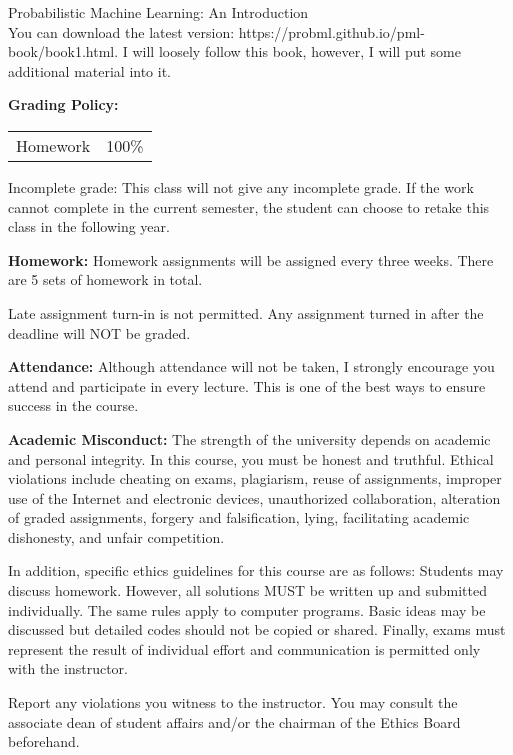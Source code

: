 \documentclass[a4paper,10pt]{article}
\begin{document}
Probabilistic Machine Learning: An Introduction \\
You can download the latest version: https://probml.github.io/pml-book/book1.html. 
 I will loosely follow this book, however, I will put some additional material into it. 


\textbf{Grading Policy:}

\begin{tabular}{lr}
Homework & 100\%\\
\end{tabular}


Incomplete grade: This class will not give any
incomplete grade. If the work cannot complete in the
current semester, the student can choose to retake this
class in the following year.






\textbf{Homework:} Homework assignments will be assigned every three weeks. There are 5 sets of homework in total. 

Late assignment turn-in is not permitted. Any assignment turned in after the deadline will NOT be graded.




\textbf{Attendance:} Although attendance will not be taken, I strongly encourage you attend and participate in every lecture. This is one of the best ways to ensure success in the course.






\textbf{Academic Misconduct:} The strength of the university depends on academic and personal integrity. In this course, you must be honest 
and truthful. Ethical violations include cheating on exams, plagiarism, reuse of assignments, improper use 
of the Internet and electronic devices, unauthorized collaboration, alteration of graded assignments, forgery 
and falsification, lying, facilitating academic dishonesty, and unfair competition.

In addition, specific ethics guidelines for this course are as follows: Students may discuss homework. However, 
all solutions MUST be written up and submitted individually. The same rules apply to computer programs. 
Basic ideas may be discussed but detailed codes should not be copied or shared. Finally, exams must 
represent the result of individual effort and communication is permitted only with the instructor.

Report any violations you witness to the instructor. You may consult the associate dean of student affairs 
and/or the chairman of the Ethics Board beforehand. 
\end{document}
